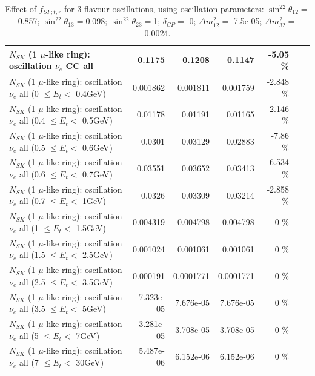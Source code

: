 \begin{table}
\begin{tabular}{| l | r | r | r  r | r  r |}
                       $N_{SK}$ (1 $\mu$-like ring): oscillation $\nu_e$  CC all &          0.1175 &         0.1208 &         0.1147 &   -5.05 \%  & & \\
\hline
$N_{SK}$ (1 $\mu$-like ring): oscillation $\nu_{e}$ all (0 $\leq E_{t} <$ 0.4GeV) &        0.001862 &       0.001811 &       0.001759 &  -2.848 \%  & & \\
$N_{SK}$ (1 $\mu$-like ring): oscillation $\nu_{e}$ all (0.4 $\leq E_{t} <$ 0.5GeV) &         0.01178 &        0.01191 &        0.01165 &  -2.146 \%  & & \\
$N_{SK}$ (1 $\mu$-like ring): oscillation $\nu_{e}$ all (0.5 $\leq E_{t} <$ 0.6GeV) &          0.0301 &        0.03129 &        0.02883 &   -7.86 \%  & & \\
$N_{SK}$ (1 $\mu$-like ring): oscillation $\nu_{e}$ all (0.6 $\leq E_{t} <$ 0.7GeV) &         0.03551 &        0.03652 &        0.03413 &  -6.534 \%  & & \\
$N_{SK}$ (1 $\mu$-like ring): oscillation $\nu_{e}$ all (0.7 $\leq E_{t} <$ 1GeV) &          0.0326 &        0.03309 &        0.03214 &  -2.858 \%  & & \\
$N_{SK}$ (1 $\mu$-like ring): oscillation $\nu_{e}$ all (1 $\leq E_{t} <$ 1.5GeV) &        0.004319 &       0.004798 &       0.004798 &       0 \%  & & \\
$N_{SK}$ (1 $\mu$-like ring): oscillation $\nu_{e}$ all (1.5 $\leq E_{t} <$ 2.5GeV) &        0.001024 &       0.001061 &       0.001061 &       0 \%  & & \\
$N_{SK}$ (1 $\mu$-like ring): oscillation $\nu_{e}$ all (2.5 $\leq E_{t} <$ 3.5GeV) &        0.000191 &      0.0001771 &      0.0001771 &       0 \%  & & \\
$N_{SK}$ (1 $\mu$-like ring): oscillation $\nu_{e}$ all (3.5 $\leq E_{t} <$ 5GeV) &       7.323e-05 &      7.676e-05 &      7.676e-05 &       0 \%  & & \\
 $N_{SK}$ (1 $\mu$-like ring): oscillation $\nu_{e}$ all (5 $\leq E_{t} <$ 7GeV) &       3.281e-05 &      3.708e-05 &      3.708e-05 &       0 \%  & & \\
$N_{SK}$ (1 $\mu$-like ring): oscillation $\nu_{e}$ all (7 $\leq E_{t} <$ 30GeV) &       5.487e-06 &      6.152e-06 &      6.152e-06 &       0 \%  & & \\
\hline
\hline
\end{tabular}
\caption{ Effect of $f_{SF; t, r}$ for 3 flavour oscillations, using oscillation parameters:  $\sin^22\theta_{12} = $0.857; $\sin^22\theta_{13} = $0.098; $\sin^22\theta_{23} = $1; $\delta_{CP} = $        0; $\Delta m^2_{12} = $    7.5e-05; $\Delta m^2_{32} = $    0.0024. }
\label{tab:num_xsec_sf_1RmuT_3f_osc_t13:0.098}
\end{table}

